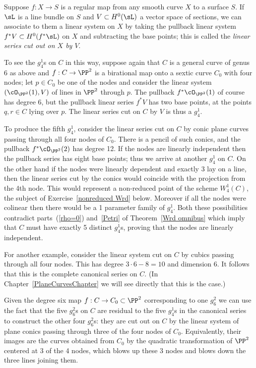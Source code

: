 Suppose $f : X \to S$ is a regular map from any smooth curve $X$ to a surface $S$. If $\sL $ is a line bundle on $S$ and $V \subset H^0(\sL )$ a vector space of sections, we can associate to them a linear system on $X$ by taking the pullback linear system $f^*V \subset H^0(f^*\sL )$ on $X$ and subtracting the base points; this is called the \emph{linear series cut out on $X$ by $V$}. 

To see the $g^{1}_{4}$s on $C$ in this way,  suppose again that $C$ is a general curve of genus 6 as above and $f : C \to \PP^2$ is a birational map onto a sextic curve $C_0$ with four nodes; let $p \in C_0$ be one of the nodes and consider the linear system $(\cO_{\PP^2}(1),V)$ of lines in $\PP^2$ through $p$. The pullback $f^*\cO_{\PP^2}(1)$ of course has degree 6, but the pullback linear series $f^*V$ has two base points, at the points $q, r \in C$ lying over $p$. The linear series cut on $C$ by $V$ is thus a $g^1_4$. 

To produce the fifth $g^1_4$, consider the linear series cut on $C$ by conic plane curves passing through all four nodes of $C_0$. There is a pencil of such conics, and the pullback $f^*\cO_{\PP^2}(2)$ has degree 12.
If the nodes are linearly independent then the pullback series has eight base points; thus we arrive at another $g^1_4$ on $C$. On the other hand if the nodes were linearly dependent and exactly 3 lay on a line, then
the linear series cut by the conics would coincide with the projection from the 4th node. 
This would represent a non-reduced point of the scheme $W^1_4(C)$, the subject of Exercise~\ref{nonreduced Wrd} below. Moreover if all the nodes
were colinear then there would be a 1 parameter family of $g^{1}_{4}$. Both these possibilities contradict
parts~(\ref{rho=0}) and~\ref{Petri} of Theorem~\ref{Wrd omnibus} which imply that $C$ must have exactly 5 distinct $g^1_4$s, proving that the nodes are linearly independent.

For another example, consider the linear system cut on $C$ by cubics passing through all four nodes. This has degree $3\cdot 6 - 8 = 10$ and dimension 6. It follows that this is the complete canonical series on $C$. (In Chapter~\ref{PlaneCurvesChapter} we will see directly that this is the case.)

Given the degree six map $f : C \to C_0 \subset \PP^2$ corresponding to one $g^2_6$ we can use the fact that the five $g^2_6$s on $C$ are residual to the five $g^1_4$s in the canonical series to construct the other four $g^2_6$s: they are cut out on $C$ by the linear system of plane conics passing through three of the four nodes of $C_0$. Equivalently, their images are the curves obtained from $C_{0}$ by the quadratic transformation
of $\PP^{2}$ centered at 3 of the 4 nodes, which blows up these 3 nodes and blows down the three lines
 joining them.
 
